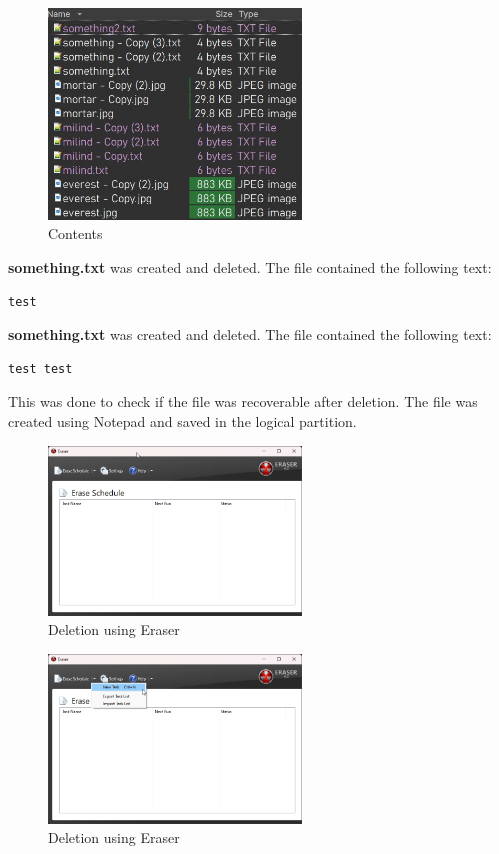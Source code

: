 \documentclass[11pt]{article}
\begin{document}
\begin{figure}[H]
    \centering
    \includegraphics[width=0.6\textwidth]{things_made.jpg}
    \caption{Contents}
    \label{fig:1}

\end{figure}
\textbf{something.txt} was created and deleted. The file contained the following text:
\begin{verbatim}
test
\end{verbatim}
\noindent
\textbf{something.txt} was created and deleted. The file contained the following text:
\begin{verbatim}
test test
\end{verbatim}
This was done to check if the file was recoverable after deletion. The file was created using Notepad and saved in the logical partition.

\begin{figure}[H]
    \centering
    \includegraphics[width=0.6\textwidth]{deleting_using_eraser.png}
    \caption{Deletion using Eraser}
    \label{fig:1}

\end{figure}

\begin{figure}[H]
    \centering
    \includegraphics[width=0.6\textwidth]{Deletion_1.png}
    \caption{Deletion using Eraser}
    \label{fig:1}

\end{figure}
\end{document}
